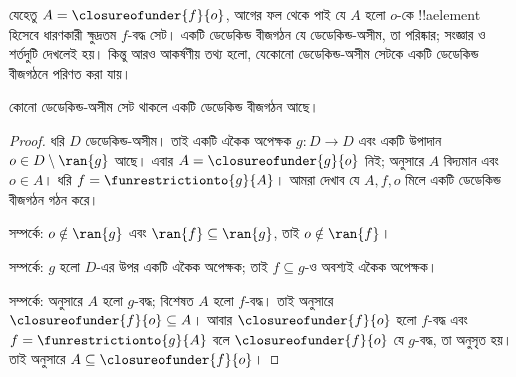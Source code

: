 \documentclass[../../../include/open-logic-section]{subfiles}
\begin{document}
যেহেতু $A = \closureofunder{f}{o}$, আগের ফল থেকে পাই যে $A$ হলো $o$-কে !!a{element} হিসেবে ধারণকারী ক্ষুদ্রতম $f$-বদ্ধ সেট। একটি ডেডেকিন্ড বীজগঠন যে ডেডেকিন্ড-অসীম, তা পরিষ্কার; সংজ্ঞার  ও  শর্তদুটি দেখলেই হয়। কিন্তু আরও আকর্ষণীয় তথ্য হলো, যেকোনো ডেডেকিন্ড-অসীম সেটকে একটি ডেডেকিন্ড বীজগঠনে পরিণত করা যায়।

\begin{thm}
কোনো ডেডেকিন্ড-অসীম সেট থাকলে একটি ডেডেকিন্ড বীজগঠন আছে।
\end{thm}

\begin{proof}
ধরি $D$ ডেডেকিন্ড-অসীম। তাই একটি একৈক অপেক্ষক $g \colon D \to
D$ এবং একটি উপাদান $o  \in D \setminus \ran{g}$ আছে। এবার $A =
\closureofunder{g}{o}$ নিই;  অনুসারে $A$ বিদ্যমান এবং $o \in A$। ধরি $f =
\funrestrictionto{g}{A}$। আমরা দেখাব যে $A, f, o$ মিলে একটি ডেডেকিন্ড বীজগঠন গঠন করে।

 সম্পর্কে: $o \notin \ran{g}$ এবং $\ran{f}
\subseteq \ran{g}$, তাই $o\notin \ran{f}$।

 সম্পর্কে: $g$ হলো $D$-এর উপর একটি একৈক অপেক্ষক; তাই $f
\subseteq g$-ও অবশ্যই একৈক অপেক্ষক।

 সম্পর্কে:  অনুসারে $A$ হলো $g$-বদ্ধ; বিশেষত $A$ হলো $f$-বদ্ধ। তাই  অনুসারে $\closureofunder{f}{o} \subseteq A$। আবার $\closureofunder{f}{o}$ হলো $f$-বদ্ধ এবং $f = \funrestrictionto{g}{A}$ বলে $\closureofunder{f}{o}$ যে $g$-বদ্ধ, তা অনুসৃত হয়। তাই  অনুসারে $A \subseteq \closureofunder{f}{o}$।
\end{proof}
\end{document}

